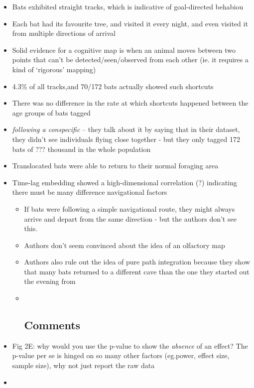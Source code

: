 \documentclass[
]{book}
\begin{document}
\begin{itemize}
\item
  Bats exhibited straight tracks, which is indicative of goal-directed behabiou
\item
  Each bat had its favourite tree, and visited it every night, and even visited it from multiple directions of arrival
\item
  Solid evidence for a cognitive map is when an animal moves between two points that can't be detected/seen/observed from each other (ie. it requires a kind of `rigorous' mapping)
\item
  4.3\% of all tracks,and 70/172 bats actually showed such shortcuts
\item
  There was no difference in the rate at which shortcuts happened between the age groups of bats tagged
\item
  \emph{following a conspecific} -- they talk about it by saying that in their dataset, they didn't see individuals flying close together - but they only tagged 172 bats of ??? thousand in the whole population
\item
  Translocated bats were able to return to their normal foraging area
\item
  Time-lag embedding showed a high-dimensional correlation (?) indicating there must be many difference navigational factors

  \begin{itemize}
  \item
    If bats were following a simple navigational route, they might always arrive and depart from the same direction - but the authors don't see this.
  \item
    Authors don't seem convinced about the idea of an olfactory map
  \item
    Authors also rule out the idea of pure path integration because they show that many bats returned to a different cave than the one they started out the evening from
  \item ~
    \hypertarget{comments}{%
    \subsection{Comments}\label{comments}}
  \end{itemize}
\item
  Fig 2E: why would you use the p-value to show the \emph{absence} of an effect? The p-value per se is hinged on so many other factors (eg.power, effect size, sample size), why not just report the raw data
\item
\end{itemize}
\end{document}
